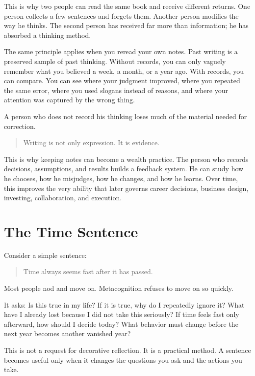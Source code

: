 This is why two people can read the same book and receive different returns. One person collects a few sentences and forgets them. Another person modifies the way he thinks. The second person has received far more than information; he has absorbed a thinking method.

The same principle applies when you reread your own notes. Past writing is a preserved sample of past thinking. Without records, you can only vaguely remember what you believed a week, a month, or a year ago. With records, you can compare. You can see where your judgment improved, where you repeated the same error, where you used slogans instead of reasons, and where your attention was captured by the wrong thing.

A person who does not record his thinking loses much of the material needed for correction.

\begin{quote}
Writing is not only expression. It is evidence.
\end{quote}

This is why keeping notes can become a wealth practice. The person who records decisions, assumptions, and results builds a feedback system. He can study how he chooses, how he misjudges, how he changes, and how he learns. Over time, this improves the very ability that later governs career decisions, business design, investing, collaboration, and execution.

\section*{The Time Sentence}

Consider a simple sentence:

\begin{quote}
Time always seems fast after it has passed.
\end{quote}

Most people nod and move on. Metacognition refuses to move on so quickly.

It asks: Is this true in my life? If it is true, why do I repeatedly ignore it? What have I already lost because I did not take this seriously? If time feels fast only afterward, how should I decide today? What behavior must change before the next year becomes another vanished year?

This is not a request for decorative reflection. It is a practical method. A sentence becomes useful only when it changes the questions you ask and the actions you take.


